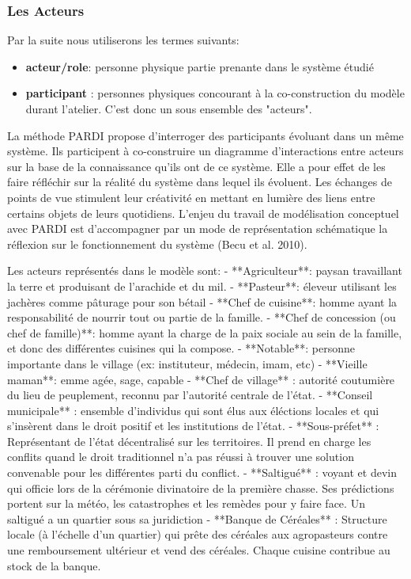 \subsubsection{Les Acteurs}

Par la suite nous utiliserons les termes suivants:
\begin{itemize}
\item \textbf{acteur/role}: personne physique partie prenante dans le système étudié
\item \textbf{participant} : personnes physiques concourant à la co-construction du modèle durant l'atelier. C'est donc un sous ensemble des "acteurs".
\end{itemize}

La méthode PARDI propose d'interroger des participants évoluant dans un même système. Ils participent à co-construire un diagramme d'interactions entre acteurs sur la base de la connaissance qu'ils ont de ce système. Elle a pour effet de les faire réfléchir sur la réalité du système dans lequel ils évoluent. Les échanges de points de vue stimulent leur créativité en mettant en lumière des liens entre certains objets de leurs quotidiens. L'enjeu du travail de modélisation conceptuel avec PARDI est d'accompagner par un mode de représentation schématique la réflexion sur le fonctionnement du système (Becu et al. 2010).

Les acteurs représentés dans le modèle sont:
- **Agriculteur**: paysan travaillant la terre et produisant de l'arachide et du mil.
- **Pasteur**: éleveur utilisant les jachères comme pâturage pour son bétail
- **Chef de cuisine**: homme ayant la responsabilité de nourrir tout ou partie de la famille.
- **Chef de concession (ou chef de famille)**: homme ayant la charge de la paix sociale au sein de la famille, et donc des différentes cuisines qui la compose.
- **Notable**: personne importante dans le village (ex: instituteur, médecin, imam, etc)
- **Vieille maman**:  emme agée, sage, capable 
- **Chef de village** : autorité coutumière du lieu de peuplement, reconnu par l'autorité centrale de l'état. 
- **Conseil municipale** : ensemble d'individus qui sont élus aux éléctions locales et qui s'insèrent dans le droit positif et les institutions de l'état.
- **Sous-préfet** : Représentant de l'état décentralisé sur les territoires. Il prend en charge les conflits quand le droit traditionnel n'a pas réussi à trouver une solution convenable pour les différentes parti du conflict.
- **Saltigué** : voyant et devin qui officie lors de la cérémonie divinatoire de la première chasse. Ses prédictions portent sur la météo, les catastrophes et les remèdes pour y faire face. Un saltigué a un quartier sous sa juridiction
- **Banque de Céréales** : Structure locale (à l'échelle d'un quartier) qui prête des céréales aux agropasteurs contre une remboursement ultérieur et vend des céréales. Chaque cuisine contribue au stock de la banque.


